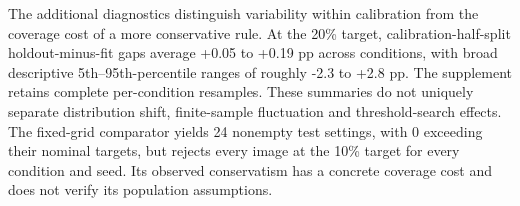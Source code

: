 The additional diagnostics distinguish variability within calibration from the coverage cost of a more conservative rule. At the 20\% target, calibration-half-split holdout-minus-fit gaps average +0.05 to +0.19 pp across conditions, with broad descriptive 5th--95th-percentile ranges of roughly -2.3 to +2.8 pp. The supplement retains complete per-condition resamples. These summaries do not uniquely separate distribution shift, finite-sample fluctuation and threshold-search effects. The fixed-grid comparator yields 24 nonempty test settings, with 0 exceeding their nominal targets, but rejects every image at the 10\% target for every condition and seed. Its observed conservatism has a concrete coverage cost and does not verify its population assumptions.


